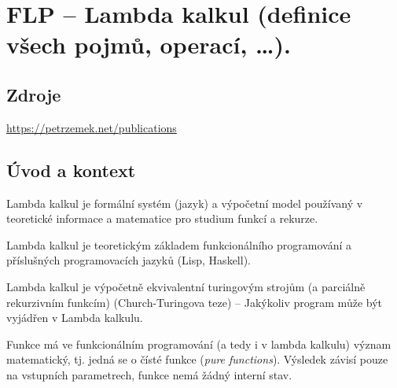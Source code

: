 

\graphicspath{{flp/lambda_kalkul/figures}}


\chapter{FLP -- Lambda kalkul (definice všech pojmů, operací, \dots).}


\section{Zdroje}

\begin{compactitem}
    \item {}
    \item {}
    \item {}
    \item {}
    \item \url{https://petrzemek.net/publications}
\end{compactitem}


\section{Úvod a kontext}

\begin{compactitem}
    \item Lambda kalkul je formální systém (jazyk) a výpočetní model používaný v teoretické informace a matematice pro studium funkcí a rekurze.

    \item Lambda kalkul je teoretickým základem funkcionálního programování a příslušných programovacích jazyků (Lisp, Haskell).

    \item Lambda kalkul je výpočetně ekvivalentní turingovým strojům (a parciálně rekurzivním funkcím) (Church-Turingova teze) -- Jakýkoliv program může být vyjádřen v Lambda kalkulu.

    \item Funkce má ve funkcionálním programování (a tedy i v lambda kalkulu) význam matematický, tj. jedná se o čísté funkce (\textit{pure functions}). Výsledek závisí pouze na vstupních parametrech, funkce nemá žádný interní stav.

\end{compactitem}

